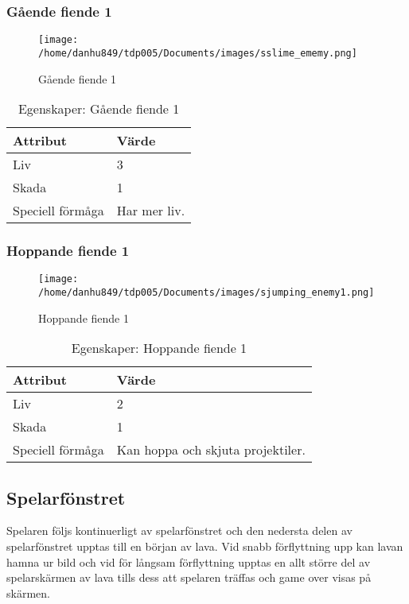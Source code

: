 \documentclass{TDP005mall}
\begin{document}
\newpage

\subsubsection*{Gående fiende 1}
\begin{figure}[h!]
  \caption{Gående fiende 1\label{fig:2}}
  \centerline{\texttt{[image: /home/danhu849/tdp005/Documents/images/sslime\_ememy.png]}}
\end{figure}

\begin{table}[h!]
  \caption{Egenskaper: Gående fiende 1\label{tab:4}}
\begin{tabular}{|l|l|}
\hline
Attribut & Värde \\\hline
Liv & 3 \\\hline
Skada & 1 \\\hline
Speciell förmåga & Har mer liv. \\\hline
\end{tabular}
\end{table}


\subsubsection*{Hoppande fiende 1}
\begin{figure}[h!]
  \texttt{[image: /home/danhu849/tdp005/Documents/images/sjumping\_enemy1.png]}
  \caption{Hoppande fiende 1\label{fig:3}}
\end{figure}

\begin{table}[h!]
  \caption{Egenskaper: Hoppande fiende 1\label{tab:5}}
\begin{tabular}{|l|l|}
\hline
Attribut & Värde \\\hline
Liv & 2 \\\hline
Skada & 1 \\\hline
Speciell förmåga & Kan hoppa och skjuta projektiler. \\\hline
\end{tabular}
\end{table}

\subsection{Spelarfönstret}
Spelaren följs kontinuerligt av spelarfönstret och den nedersta delen av spelarfönstret upptas till en början av lava. Vid snabb förflyttning upp kan lavan hamna ur bild och vid för långsam förflyttning upptas en allt större del av spelarskärmen av lava tills dess att spelaren träffas och game over visas på skärmen.
\end{document}
